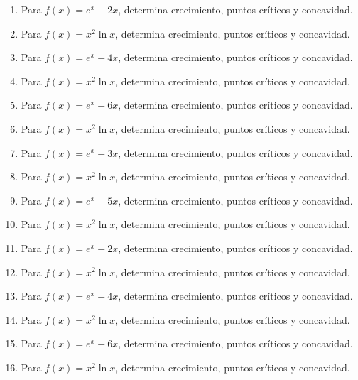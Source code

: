 \documentclass[11pt,a4paper]{article}
\begin{document}
\begin{enumerate}[label=\textbf{E\arabic*.},start=161]

\item Para $f(x)=e^x-2x$, determina crecimiento, puntos críticos y concavidad.

\item Para $f(x)=x^2\ln x$, determina crecimiento, puntos críticos y concavidad.

\item Para $f(x)=e^x-4x$, determina crecimiento, puntos críticos y concavidad.

\item Para $f(x)=x^2\ln x$, determina crecimiento, puntos críticos y concavidad.

\item Para $f(x)=e^x-6x$, determina crecimiento, puntos críticos y concavidad.

\item Para $f(x)=x^2\ln x$, determina crecimiento, puntos críticos y concavidad.

\item Para $f(x)=e^x-3x$, determina crecimiento, puntos críticos y concavidad.

\item Para $f(x)=x^2\ln x$, determina crecimiento, puntos críticos y concavidad.

\item Para $f(x)=e^x-5x$, determina crecimiento, puntos críticos y concavidad.

\item Para $f(x)=x^2\ln x$, determina crecimiento, puntos críticos y concavidad.

\item Para $f(x)=e^x-2x$, determina crecimiento, puntos críticos y concavidad.

\item Para $f(x)=x^2\ln x$, determina crecimiento, puntos críticos y concavidad.

\item Para $f(x)=e^x-4x$, determina crecimiento, puntos críticos y concavidad.

\item Para $f(x)=x^2\ln x$, determina crecimiento, puntos críticos y concavidad.

\item Para $f(x)=e^x-6x$, determina crecimiento, puntos críticos y concavidad.

\item Para $f(x)=x^2\ln x$, determina crecimiento, puntos críticos y concavidad.


\end{enumerate}
\end{document}
